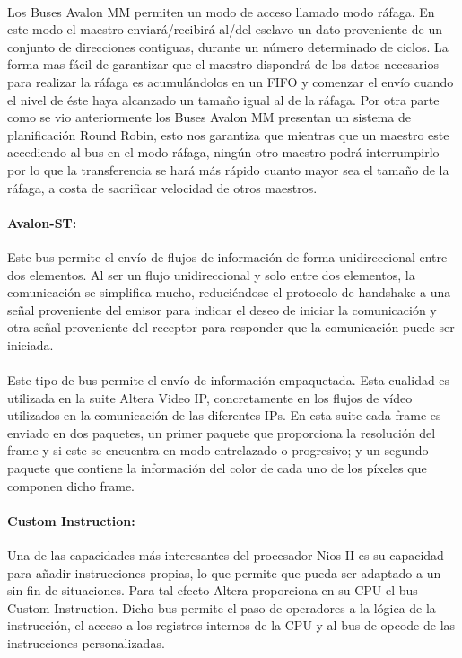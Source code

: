 \documentclass[a4paper,12pt,titlepage,final]{book}
\begin{document}
\paragraph{}
Los Buses Avalon MM permiten un modo de acceso llamado modo ráfaga. En este modo el maestro enviará/recibirá al/del esclavo un dato proveniente de un conjunto de direcciones contiguas, durante un número determinado de ciclos. La forma mas fácil de garantizar que el maestro dispondrá de los datos necesarios para realizar la ráfaga es acumulándolos en un FIFO y comenzar el envío cuando el nivel de éste haya alcanzado un tamaño igual al de la ráfaga. Por otra parte como se vio anteriormente los Buses Avalon MM presentan un sistema de planificación Round Robin, esto nos garantiza que mientras que un maestro este accediendo al bus en el modo ráfaga, ningún otro maestro podrá interrumpirlo por lo que la transferencia se hará más rápido cuanto mayor sea el tamaño de la ráfaga, a costa de sacrificar velocidad de otros maestros. 

\paragraph{Avalon-ST:}
Este bus permite el envío de flujos de información de forma unidireccional entre dos elementos. Al ser un flujo unidireccional y solo entre dos elementos, la comunicación se simplifica mucho, reduciéndose el protocolo de handshake a una señal proveniente del emisor para indicar el deseo de iniciar la comunicación y otra señal proveniente del receptor para responder que la comunicación puede ser iniciada.

\paragraph{}
Este tipo de bus permite el envío de información empaquetada. Esta cualidad es utilizada en la suite Altera Video IP, concretamente en los flujos de vídeo utilizados en la comunicación de las diferentes IPs. En esta suite cada frame es enviado en dos paquetes, un primer paquete que proporciona la resolución del frame y si este se encuentra en modo entrelazado o progresivo; y un segundo paquete que contiene la información del color de cada uno de los píxeles que componen dicho frame. 

\paragraph{Custom Instruction:}
Una de las capacidades más interesantes del procesador Nios II es su capacidad para añadir instrucciones propias, lo que permite que pueda ser adaptado a un sin fin de situaciones. Para tal efecto Altera proporciona en su CPU el bus Custom Instruction. Dicho bus permite el paso de operadores a la lógica de la instrucción, el acceso a los registros internos de la CPU y al bus de opcode de las instrucciones personalizadas.  
\end{document}
